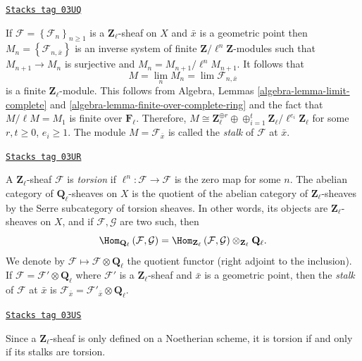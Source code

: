 \begin{remark}
\label{trace-remark-stalk-l-adic-sheaf}
\href{https://stacks.math.columbia.edu/tag/03UQ}{\texttt{Stacks tag 03UQ}}

If $\mathcal{F} = \left\{\mathcal{F}_n\right\}_{n\geq 1}$ is a
$\mathbf{Z}_\ell$-sheaf on $X$ and $\bar x$ is a geometric point then
$M_n = \left\{\mathcal{F}_{n, \bar x}\right\}$ is an inverse system of finite
$\mathbf{Z}/\ell^n\mathbf{Z}$-modules such that $M_{n+1}\to M_n$ is surjective
and $M_n = M_{n+1}/\ell^n M_{n+1}$. It follows that
$$
M = \lim_n M_n = \lim \mathcal{F}_{n, \bar x}
$$
is a finite $\mathbf{Z}_\ell$-module. This follows from
Algebra, Lemmas \ref{algebra-lemma-limit-complete} and
\ref{algebra-lemma-finite-over-complete-ring} and the fact that
$M/\ell M = M_1$ is finite over $\mathbf{F}_\ell$.
Therefore, $M\cong \mathbf{Z}_\ell^{\oplus r} \oplus \oplus_{i = 1}^t
\mathbf{Z}_\ell/\ell^{e_i}\mathbf{Z}_\ell$ for some $r, t\geq 0$, $e_i\geq 1$.
The module $M = \mathcal{F}_{\bar x}$ is called the {\it stalk} of
$\mathcal{F}$ at $\bar x$.
\end{remark}

\begin{definition}
\label{trace-definition-torsion-l-adic-sheaf}
\href{https://stacks.math.columbia.edu/tag/03UR}{\texttt{Stacks tag 03UR}}

A $\mathbf{Z}_\ell$-sheaf $\mathcal{F}$ is {\it torsion} if
$\ell^n : \mathcal{F} \to \mathcal{F}$ is the zero map for some $n$.
The abelian category
of $\mathbf{Q}_\ell$-sheaves on $X$ is the quotient of the abelian category of
$\mathbf{Z}_\ell$-sheaves by the Serre subcategory of torsion sheaves. In
other words, its objects are $\mathbf{Z}_\ell$-sheaves on $X$, and if
$\mathcal{F}, \mathcal{G}$ are two such, then
$$
\Hom_{\mathbf{Q}_\ell} \left(\mathcal{F}, \mathcal{G} \right) =
\Hom_{\mathbf{Z}_\ell} \left(\mathcal{F}, \mathcal{G}\right)
\otimes_{\mathbf{Z}_\ell} \mathbf{Q}_\ell.
$$
We denote by $\mathcal{F} \mapsto \mathcal{F} \otimes \mathbf{Q}_\ell$ the
quotient functor (right adjoint to the inclusion). If $\mathcal{F} =
\mathcal{F}' \otimes \mathbf{Q}_\ell$ where $\mathcal{F}'$ is a
$\mathbf{Z}_\ell$-sheaf and $\bar x$ is a geometric point, then the
{\it stalk} of $\mathcal{F}$ at $\bar x$ is $\mathcal{F}_{\bar x} =
\mathcal{F}'_{\bar x} \otimes \mathbf{Q}_\ell$.
\end{definition}

\begin{remark}
\label{trace-remark-torsion-stalks}
\href{https://stacks.math.columbia.edu/tag/03US}{\texttt{Stacks tag 03US}}

Since a $\mathbf{Z}_\ell$-sheaf is only defined on a Noetherian scheme, it is
torsion if and only if its stalks are torsion.
\end{remark}

